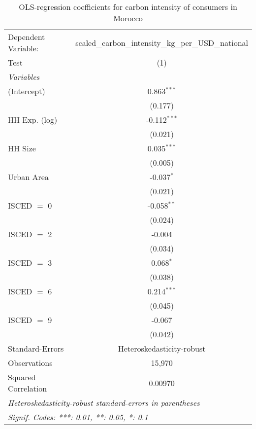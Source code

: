 
\begin{table}[htbp!]
   \centering
   \small
   \begin{adjustbox}{width = 1\textwidth, max height = 0.95\textheight, center}
      \begin{threeparttable}[b]
         \caption{\label{tab:OLS_1_MAR} OLS-regression coefficients for carbon intensity of consumers in Morocco}
         \begin{tabular}{lc}
            \tabularnewline \midrule \midrule
            Dependent Variable: & scaled\_carbon\_intensity\_kg\_per\_USD\_national\\        
            Test                & (1)\\  
            \midrule
            \emph{Variables}\\
            (Intercept)         & 0.863$^{***}$\\   
                                & (0.177)\\   
            HH Exp. (log)       & -0.112$^{***}$\\   
                                & (0.021)\\   
            HH Size             & 0.035$^{***}$\\   
                                & (0.005)\\   
            Urban Area          & -0.037$^{*}$\\   
                                & (0.021)\\   
            ISCED $=$ 0         & -0.058$^{**}$\\   
                                & (0.024)\\   
            ISCED $=$ 2         & -0.004\\   
                                & (0.034)\\   
            ISCED $=$ 3         & 0.068$^{*}$\\   
                                & (0.038)\\   
            ISCED $=$ 6         & 0.214$^{***}$\\   
                                & (0.045)\\   
            ISCED $=$ 9         & -0.067\\   
                                & (0.042)\\   
            \midrule 
            Standard-Errors     & Heteroskedasticity-robust \\   
            Observations        & 15,970\\  
            Squared Correlation & 0.00970\\  
            \midrule \midrule
            \multicolumn{2}{l}{\emph{Heteroskedasticity-robust standard-errors in parentheses}}\\
            \multicolumn{2}{l}{\emph{Signif. Codes: ***: 0.01, **: 0.05, *: 0.1}}\\
         \end{tabular}
         

\end{threeparttable}
\end{adjustbox}
\end{table}
